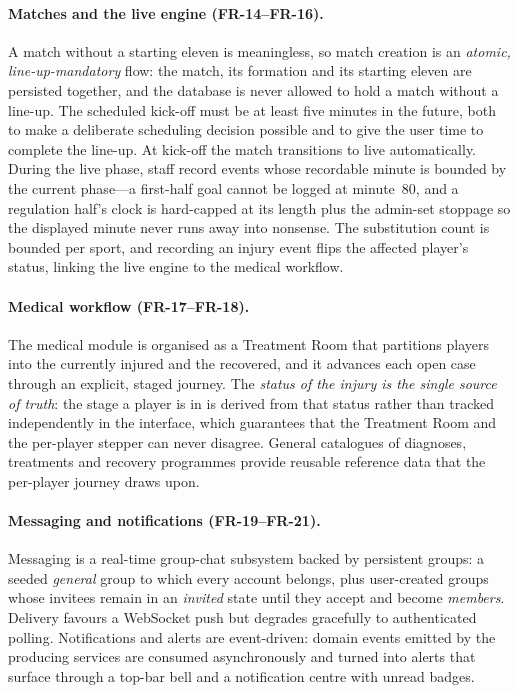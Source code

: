 \paragraph{Matches and the live engine (FR-14--FR-16).} A match without a starting
eleven is meaningless, so match creation is an \emph{atomic, line-up-mandatory} flow:
the match, its formation and its starting eleven are persisted together, and the
database is never allowed to hold a match without a line-up. The scheduled kick-off
must be at least five minutes in the future, both to make a deliberate scheduling
decision possible and to give the user time to complete the line-up. At kick-off the
match transitions to live automatically. During the live phase, staff record events
whose recordable minute is bounded by the current phase---a first-half goal cannot be
logged at minute~80, and a regulation half's clock is hard-capped at its length plus
the admin-set stoppage so the displayed minute never runs away into nonsense. The
substitution count is bounded per sport, and recording an injury event flips the
affected player's status, linking the live engine to the medical workflow.

\paragraph{Medical workflow (FR-17--FR-18).} The medical module is organised as a
Treatment Room that partitions players into the currently injured and the recovered,
and it advances each open case through an explicit, staged journey. The
\emph{status of the injury is the single source of truth}: the stage a player is in
is derived from that status rather than tracked independently in the interface, which
guarantees that the Treatment Room and the per-player stepper can never disagree.
General catalogues of diagnoses, treatments and recovery programmes provide reusable
reference data that the per-player journey draws upon.

\paragraph{Messaging and notifications (FR-19--FR-21).} Messaging is a real-time
group-chat subsystem backed by persistent groups: a seeded \emph{general} group to
which every account belongs, plus user-created groups whose invitees remain in an
\emph{invited} state until they accept and become \emph{members}. Delivery favours a
WebSocket push but degrades gracefully to authenticated polling. Notifications and
alerts are event-driven: domain events emitted by the producing services are consumed
asynchronously and turned into alerts that surface through a top-bar bell and a
notification centre with unread badges.

